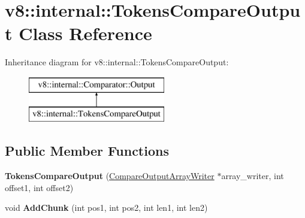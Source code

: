 \hypertarget{classv8_1_1internal_1_1_tokens_compare_output}{}\section{v8\+:\+:internal\+:\+:Tokens\+Compare\+Output Class Reference}
\label{classv8_1_1internal_1_1_tokens_compare_output}
Inheritance diagram for v8\+:\+:internal\+:\+:Tokens\+Compare\+Output\+:\begin{figure}[H]
\begin{center}
\leavevmode
\includegraphics[height=2.000000cm]{classv8_1_1internal_1_1_tokens_compare_output}
\end{center}
\end{figure}
\subsection*{Public Member Functions}
\begin{DoxyCompactItemize}
\item 
{\bfseries Tokens\+Compare\+Output} (\hyperlink{classv8_1_1internal_1_1_compare_output_array_writer}{Compare\+Output\+Array\+Writer} $\ast$array\+\_\+writer, int offset1, int offset2)\hypertarget{classv8_1_1internal_1_1_tokens_compare_output_af208a97fd57f3a1f27153509c6afbb86}{}\label{classv8_1_1internal_1_1_tokens_compare_output_af208a97fd57f3a1f27153509c6afbb86}

\item 
void {\bfseries Add\+Chunk} (int pos1, int pos2, int len1, int len2)\hypertarget{classv8_1_1internal_1_1_tokens_compare_output_a9420834128351e8f2e745bd2838e9d6e}{}\label{classv8_1_1internal_1_1_tokens_compare_output_a9420834128351e8f2e745bd2838e9d6e}

\end{DoxyCompactItemize}
